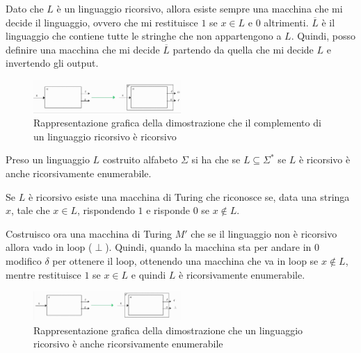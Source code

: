 \begin{dimostrazione}
    Dato che $L$ è un linguaggio ricorsivo, allora esiste sempre una macchina che
    mi decide il linguaggio, ovvero che mi restituisce $1$ se $x \in L$ e $0$
    altrimenti. $\overline{L}$ è il linguaggio che contiene tutte le stringhe
    che non appartengono a $L$. Quindi, posso definire una macchina che mi
    decide $\overline{L}$ partendo da quella che mi decide $L$ e invertendo gli
    output.
    \begin{figure}[!ht]
        \centering
        \includegraphics[width=0.5\textwidth]{img/MacchineTuring/dimostrazione1.png}
        \caption{Rappresentazione grafica della dimostrazione che il complemento
            di un linguaggio ricorsivo è ricorsivo}
    \end{figure}
\end{dimostrazione}
\begin{teorema}
    Preso un linguaggio $L$ costruito alfabeto $\Sigma$ si ha che se
    $L \subseteq \Sigma^{\ast}$ se $L$ è ricorsivo è anche ricorsivamente
    enumerabile.
\end{teorema}
\begin{dimostrazione}
    Se $L$ è ricorsivo esiste una macchina di Turing che riconosce se, data una
    stringa $x$, tale che $x \in L$, rispondendo $1$ e risponde $0$ se $x \not\in
        L$.

    Costruisco ora una macchina di Turing $M'$ che se il linguaggio non è
    ricorsivo allora vado in loop ($\perp$). Quindi, quando la macchina sta per
    andare in $0$ modifico $\delta$ per ottenere il loop, ottenendo una macchina
    che va in loop se $x \not\in L$, mentre restituisce $1$ se $x \in L$ e
    quindi $L$ è ricorsivamente enumerabile.
    \begin{figure}[!ht]
        \centering
        \includegraphics[width=0.5\textwidth]{img/MacchineTuring/dimostrazione2.png}
        \caption{Rappresentazione grafica della dimostrazione che un linguaggio
            ricorsivo è anche ricorsivamente enumerabile}
    \end{figure}
\end{dimostrazione}
